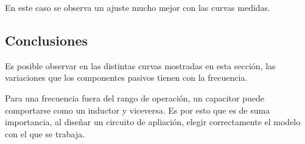 En este caso se observa un ajuste mucho mejor con las curvas medidas.


\subsection{Conclusiones}
Es posible observar en las distintas curvas mostradas en esta secci\'on, las variaciones que los componentes pasivos tienen con la frecuencia. 

Para una frecuencia fuera del rango de operaci\'on, un capacitor puede comportarse como un inductor y viceversa. Es por esto que es de suma importancia, al dise\~nar un circuito de apliaci\'on, elegir correctamente el modelo con el que se trabaja.